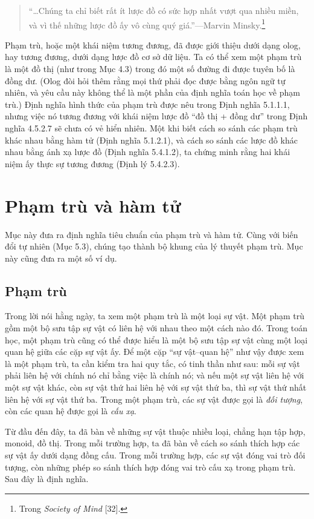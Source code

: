 \begin{quote}
``\ldots Chúng ta chỉ biết rất ít lược đồ có sức hợp nhất vượt qua nhiều miền, và vì thế những lược đồ ấy vô cùng quý giá.''---Marvin Minsky.\footnote{Trong \emph{Society of Mind} [32].}
\end{quote}
Phạm trù, hoặc một khái niệm tương đương, đã được giới thiệu dưới dạng olog, hay tương đương, dưới dạng lược đồ cơ sở dữ liệu. Ta có thể xem một phạm trù là một đồ thị (như trong Mục 4.3) trong đó một số đường đi được tuyên bố là đồng dư. (Olog đòi hỏi thêm rằng mọi thứ phải đọc được bằng ngôn ngữ tự nhiên, và yêu cầu này không thể là một phần của định nghĩa toán học về phạm trù.) Định nghĩa hình thức của phạm trù được nêu trong Định nghĩa 5.1.1.1, nhưng việc nó tương đương với khái niệm lược đồ ``đồ thị + đồng dư'' trong Định nghĩa 4.5.2.7 sẽ chưa có vẻ hiển nhiên. Một khi biết cách so sánh các phạm trù khác nhau bằng hàm tử (Định nghĩa 5.1.2.1), và cách so sánh các lược đồ khác nhau bằng ánh xạ lược đồ (Định nghĩa 5.4.1.2), ta chứng minh rằng hai khái niệm ấy thực sự tương đương (Định lý 5.4.2.3).
\section{Phạm trù và hàm tử}
Mục này đưa ra định nghĩa tiêu chuẩn của phạm trù và hàm tử. Cùng với biến đổi tự nhiên (Mục 5.3), chúng tạo thành bộ khung của lý thuyết phạm trù. Mục này cũng đưa ra một số ví dụ.
\subsection{Phạm trù}
Trong lời nói hằng ngày, ta xem một phạm trù là một loại sự vật. Một phạm trù gồm một bộ sưu tập sự vật có liên hệ với nhau theo một cách nào đó. Trong toán học, một phạm trù cũng có thể được hiểu là một bộ sưu tập sự vật cùng một loại quan hệ giữa các cặp sự vật ấy. Để một cặp ``sự vật--quan hệ'' như vậy được xem là một phạm trù, ta cần kiểm tra hai quy tắc, có tinh thần như sau: mỗi sự vật phải liên hệ với chính nó chỉ bằng việc là chính nó; và nếu một sự vật liên hệ với một sự vật khác, còn sự vật thứ hai liên hệ với sự vật thứ ba, thì sự vật thứ nhất liên hệ với sự vật thứ ba. Trong một phạm trù, các sự vật được gọi là \emph{đối tượng}, còn các quan hệ được gọi là \emph{cấu xạ}.

Từ đầu đến đây, ta đã bàn về những sự vật thuộc nhiều loại, chẳng hạn tập hợp, monoid, đồ thị. Trong mỗi trường hợp, ta đã bàn về cách so sánh thích hợp các sự vật ấy dưới dạng đồng cấu. Trong mỗi trường hợp, các sự vật đóng vai trò đối tượng, còn những phép so sánh thích hợp đóng vai trò cấu xạ trong phạm trù. Sau đây là định nghĩa.
